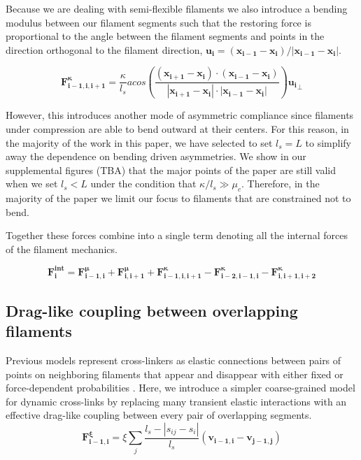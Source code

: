 \documentclass[10pt,letterpaper]{article}
\begin{document}
Because we are dealing with semi-flexible filaments we also introduce a bending modulus between our filament segments such that the restoring force is proportional to the angle between the filament segments and points in the direction orthogonal to the filament direction, $\mathbf{u_i}=(\mathbf{x_{i-1}}-\mathbf{x_{i}})/|\mathbf{x_{i-1}}-\mathbf{x_{i}}|$.   

\begin{equation}
\label{eqn:bend_spring}
\mathbf{F^{\kappa}_{i-1,i,i+1}} = \frac{\kappa}{l_s} acos \left(\frac{(\mathbf{x_{i+1}}-\mathbf{x_i})\cdot (\mathbf{x_{i-1}}-\mathbf{x_i})}{|\mathbf{x_{i+1}}-\mathbf{x_i}|\cdot |\mathbf{x_{i-1}}-\mathbf{x_i}|}\right)\mathbf{u_i}_\perp
\end{equation}

However, this introduces another mode of asymmetric compliance since filaments under compression are able to bend outward at their centers.  For this reason, in the majority of the work in this paper, we have selected to set $l_s=L$ to simplify away the dependence on bending driven asymmetries.  We show in our supplemental figures (TBA) that the major points of the paper are still valid when we set $l_s<L$ under the condition that $\kappa/l_s\gg\mu_c$.  Therefore, in the majority of the paper we limit our focus to filaments that are constrained not to bend.

Together these forces combine into a single term denoting all the internal forces of the filament mechanics.

\begin{equation}
\label{eqn:internal}
\mathbf{F^{int}_i} = \mathbf{F^{\mu}_{i-1,i}} + \mathbf{F^{\mu}_{i,i+1}} + \mathbf{F^{\kappa}_{i-1,i,i+1}} - \mathbf{F^{\kappa}_{i-2,i-1,i}} - \mathbf{F^{\kappa}_{i,i+1,i+2}}
\end{equation}

\subsection*{Drag-like coupling between overlapping filaments}
\label{exp_drag}
Previous models represent cross-linkers as elastic connections between pairs of points on neighboring filaments that appear and disappear with either fixed or force-dependent probabilities \cite{model_taeyoon,theo_crosslinknonlinear}.  Here, we introduce a simpler coarse-grained model for dynamic cross-links by replacing many transient elastic interactions with an effective drag-like coupling between every pair of overlapping segments.
\begin{equation}
\label{eqn:drag}
\mathbf{F^{\xi}_{i-1,i}} = \xi \sum_j \frac{l_s-|s_{ij}-s_i|}{l_s}  (\mathbf{v_{i-1,i}}-\mathbf{v_{j-1,j}}) 
\end{equation}
\end{document}

